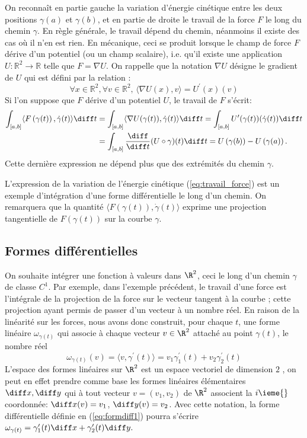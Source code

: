 On reconnaît en partie gauche la variation d'énergie cinétique entre les deux positions $\gamma(a)$
et $\gamma(b)$, et en partie de droite le travail de la force $F$ le long du chemin $\gamma$. En règle générale, le travail dépend du chemin, néanmoins il existe des cas où il n'en est rien. En mécanique, ceci se produit
lorsque le champ de force $F$ dérive d'un potentiel (ou un champ scalaire), i.e. qu'il existe une application
$U \colon \mathbb{R}^2 \to \mathbb{R}$ telle que $F = \nabla U$. On
rappelle que la notation $\nabla U$ désigne le gradient de $U$ qui est
défini par la relation :
\[
\forall x \in \mathbb{R}^2, \forall v \in \mathbb{R}^2, \, \langle \nabla
U(x),v \rangle = U^\prime(x)(v)
\]
Si l'on suppose que $F$ dérive d'un potentiel $U$, le travail de $F$ s'écrit:
\begin{align*}
\int_{[a,b]} \langle F\left(\gamma(t)\right), \dot{\gamma}(t) \rangle
\diff t&  = \int_{[a,b]} \langle \nabla U(\gamma(t)), \dot{\gamma}(t)
\rangle \diff t = \int_{[a,b]} U^\prime(\gamma(t))(\dot{\gamma}(t)) \diff t \\
& = \int_{[a,b]} \frac{\diff}{\diff t}(U \circ \gamma)(t) \diff t = U\left(\gamma(b)\right) - U\left(\gamma(a)\right).
\end{align*}
Cette dernière expression ne dépend plus que des extrémités du chemin $\gamma$. 

L'expression de la variation de l'énergie cinétique (\ref{eq:travail_force}) est un exemple d'intégration d'une forme différentielle le long d'un chemin. On remarquera que la quantité $\langle F\left(\gamma(t)\right), \dot{\gamma}(t) \rangle$ exprime une projection tangentielle de $F\left(\gamma(t)\right)$ sur la courbe $\gamma$. 
\subsection{Formes différentielles}

On souhaite intégrer une fonction à valeurs dans $\R^2$, ceci le long d'un chemin $\gamma$ de classe $C^1$. Par exemple, dans l'exemple précédent, le travail d'une force est l'intégrale de la projection de la force sur le vecteur tangent à la courbe ; cette projection ayant permis de passer d'un vecteur à un nombre réel. En raison de la linéarité sur les forces, nous avons donc construit, pour chaque $t$, une forme linéaire $\omega_{\gamma(t)}$ qui associe à chaque vecteur $v \in \R^2$ attaché au point $\gamma(t)$, le nombre réel 
\begin{equation}\label{eq:formdiff1}
\omega_{\gamma(t)}(v)=\langle v, \gamma^\prime(t) \rangle = v_1 \gamma^\prime_1(t) + v_2 \gamma^\prime_2(t)
\end{equation}
L'espace des formes linéaires sur $\R^2$ est un espace vectoriel de dimension $2$ , on peut en effet prendre comme base les formes linéaires élémentaires $\diff x,\diff y$ qui à tout vecteur $v=(v_1,v_2)$ de $\R^2$ associent la $i \ieme{}$  coordonnée: $\diff x(v) = v_1$, $\diff y(v)=v_2$. Avec cette notation, la forme différentielle définie en (\ref{eq:formdiff1}) pourra s'écrire $\omega_{\gamma(t)} = \gamma^\prime_1(t) \diff x + \gamma^\prime_2(t) \diff y.$ 





